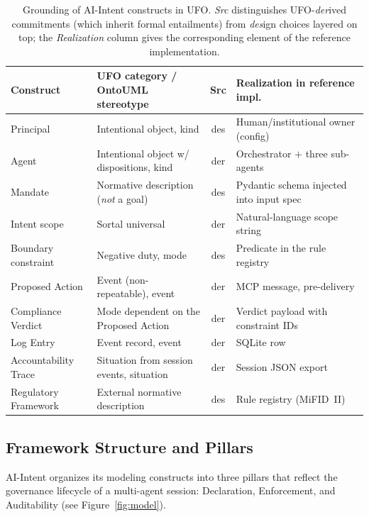 \documentclass[runningheads]{llncs}
\begin{document}
\vspace{-6pt}
\newcommand{\uml}[1]{\guillemotleft #1\guillemotright}
\begin{table}
\centering
\caption{Grounding of AI-Intent constructs in UFO. \emph{Src}
distinguishes UFO-\emph{der}ived commitments (which inherit formal
entailments) from \emph{des}ign choices layered on top; the
\emph{Realization} column gives the corresponding element of the
reference implementation.}
\label{tab:ufo}
\begin{tabularx}{\textwidth}{@{}p{2.5cm} p{4.1cm} c X@{}}
\toprule
\textbf{Construct} & \textbf{UFO category / OntoUML stereotype} &
\textbf{Src} & \textbf{Realization in reference impl.} \\
\midrule
Principal & Intentional object, \uml{kind} & des &
    Human/institutional owner (config) \\
Agent & Intentional object w/ dispositions, \uml{kind} & der &
    Orchestrator $+$ three sub-agents \\
Mandate & Normative description (\emph{not} a goal) & des &
    Pydantic schema injected into input spec \\
Intent scope & Sortal universal & der &
    Natural-language scope string \\
Boundary constraint & Negative duty, \uml{mode} & des &
    Predicate in the rule registry \\
Proposed Action & Event (non-repeatable), \uml{event} & der &
    MCP message, pre-delivery \\
Compliance Verdict & Mode dependent on the Proposed Action & der &
    Verdict payload with constraint IDs \\
Log Entry & Event record, \uml{event} & der &
    SQLite row \\
Accountability Trace & Situation from session events, \uml{situation} &
    der & Session JSON export \\
Regulatory Framework & External normative description & des &
    Rule registry (MiFID~II) \\
\bottomrule
\end{tabularx}
\end{table}

\subsection{Framework Structure and Pillars}
\label{sec:pillars}

AI-Intent organizes its modeling constructs into three pillars that
reflect the governance lifecycle of a multi-agent session: Declaration,
Enforcement, and Auditability (see Figure~\ref{fig:model}).
\end{document}
